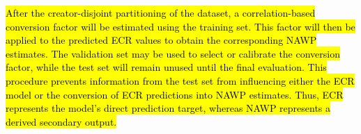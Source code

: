 \hl{After the creator-disjoint partitioning of the dataset, a correlation-based conversion factor will be estimated using the training set. This factor will then be applied to the predicted ECR values to obtain the corresponding NAWP estimates. The validation set may be used to select or calibrate the conversion factor, while the test set will remain unused until the final evaluation. This procedure prevents information from the test set from influencing either the ECR model or the conversion of ECR predictions into NAWP estimates. Thus, ECR represents the model's direct prediction target, whereas NAWP represents a derived secondary output.}







